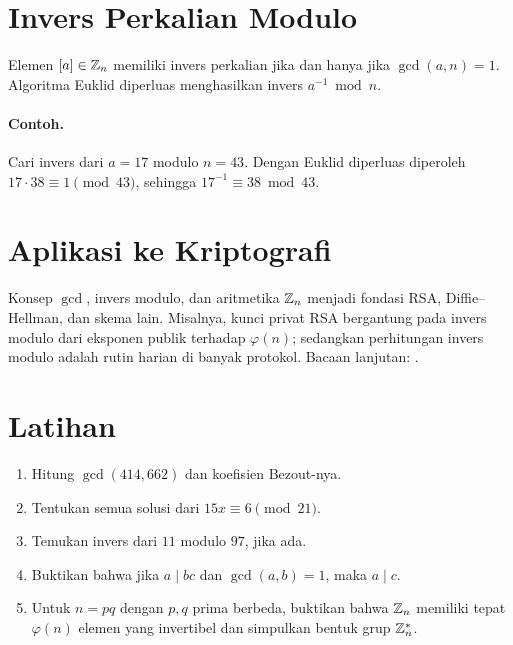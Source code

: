 \documentclass[../main.tex]{subfiles}
\begin{document}
\section{Invers Perkalian Modulo}
Elemen \([a]\in\mathbb{Z}_n\) memiliki invers perkalian jika dan hanya jika \(\gcd(a,n)=1\). Algoritma Euklid diperluas menghasilkan invers \(a^{-1} \bmod n\).

\paragraph{Contoh.} Cari invers dari \(a=17\) modulo \(n=43\). Dengan Euklid diperluas diperoleh \(17\cdot 38 \equiv 1 \pmod{43}\), sehingga \(17^{-1}\equiv 38\bmod 43\).

\section{Aplikasi ke Kriptografi}
Konsep \(\gcd\), invers modulo, dan aritmetika \(\mathbb{Z}_n\) menjadi fondasi RSA, Diffie--Hellman, dan skema lain. Misalnya, kunci privat RSA bergantung pada invers modulo dari eksponen publik terhadap \(\varphi(n)\); sedangkan perhitungan invers modulo adalah rutin harian di banyak protokol. Bacaan lanjutan: \citep{hoffstein,hardywright,nivenzuckermanmontgomery}.

\section{Latihan}
\begin{enumerate}
  \item Hitung \(\gcd(414, 662)\) dan koefisien Bezout-nya.
  \item Tentukan semua solusi dari \(15x\equiv 6 \pmod{21}\).
  \item Temukan invers dari \(11\) modulo \(97\), jika ada.
  \item Buktikan bahwa jika \(a\mid bc\) dan \(\gcd(a,b)=1\), maka \(a\mid c\).
  \item Untuk \(n=pq\) dengan \(p,q\) prima berbeda, buktikan bahwa \(\mathbb{Z}_n\) memiliki tepat \(\varphi(n)\) elemen yang invertibel dan simpulkan bentuk grup \(\mathbb{Z}_n^*\).
\end{enumerate}
\end{document}
